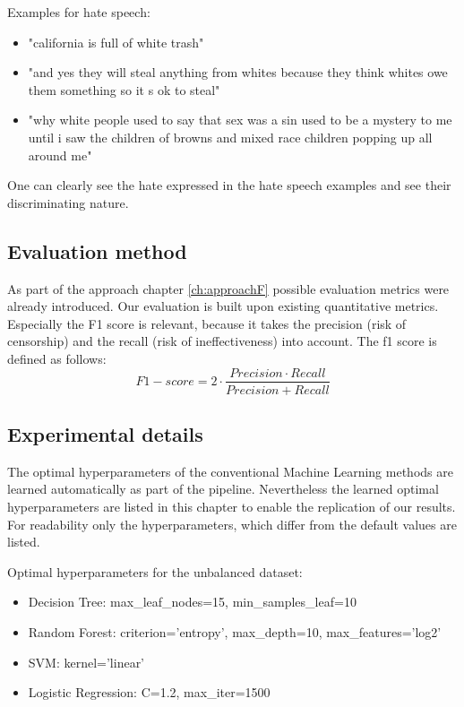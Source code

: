 \noindent
Examples for hate speech:
\begin{itemize}
    \item "california is full of white trash"
    \item "and yes they will steal anything from whites because they think whites owe them something so it s ok to steal"
    \item "why white people used to say that sex was a sin used to be a mystery to me until i saw the children of browns and mixed race children popping up all around me"
\end{itemize}

One can clearly see the hate expressed in the hate speech examples and see their discriminating nature.


\subsection{Evaluation method}

As part of the approach chapter \ref{ch:approachF} possible evaluation metrics were already introduced. Our evaluation is built upon existing quantitative metrics. Especially the F1 score is relevant, because it takes the precision (risk of censorship) and the recall (risk of ineffectiveness) into account. The f1 score is defined as follows:
\begin{equation}
F1-score = 2 \cdot \frac{Precision \cdot Recall}{Precision + Recall}
\end{equation}

\subsection{Experimental details}

The optimal hyperparameters of the conventional Machine Learning methods are learned automatically as part of the pipeline. Nevertheless the learned optimal hyperparameters are listed in this chapter to enable the replication of our results. For readability only the hyperparameters, which differ from the default values are listed.

Optimal hyperparameters for the unbalanced dataset:
\begin{itemize}
	\item Decision Tree: max\_leaf\_nodes=15, min\_samples\_leaf=10
	\item Random Forest: criterion='entropy', max\_depth=10, max\_features='log2'
	\item SVM: kernel='linear'
	\item Logistic Regression: C=1.2, max\_iter=1500
\end{itemize}

